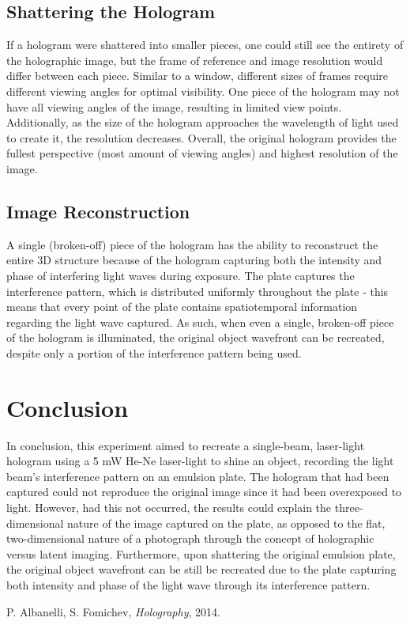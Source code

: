 \documentclass[12pt, letterpaper, twoside]{article}
\begin{document}
\subsection{Shattering the Hologram}

If a hologram were shattered into smaller pieces, one could still see the entirety of the holographic image, but the frame of reference and image resolution would differ between each piece. Similar to a window, different sizes of frames require different viewing angles for optimal visibility. One piece of the hologram may not have all viewing angles of the image, resulting in limited view points. Additionally, as the size of the hologram approaches the wavelength of light used to create it, the resolution decreases. Overall, the original hologram provides the fullest perspective (most amount of viewing angles) and highest resolution of the image. 

\subsection{Image Reconstruction}

A single (broken-off) piece of the hologram has the ability to reconstruct the entire 3D structure because of the hologram capturing both the intensity and phase of interfering light waves during exposure. The plate captures the interference pattern, which is distributed uniformly throughout the plate - this means that every point of the plate contains spatiotemporal information regarding the light wave captured. As such, when even a single, broken-off piece of the hologram is illuminated, the original object wavefront can be recreated, despite only a portion of the interference pattern being used.




\section{Conclusion}

In conclusion, this experiment aimed to recreate a single-beam, laser-light hologram using a 5 mW He-Ne laser-light to shine an object, recording the light beam's interference pattern on an emulsion plate. The hologram that had been captured could not reproduce the original image since it had been overexposed to light. However, had this not occurred, the results could explain the three-dimensional nature of the image captured on the plate, as opposed to the flat, two-dimensional nature of a photograph through the concept of holographic versus latent imaging. Furthermore, upon shattering the original emulsion plate, the original object wavefront can be still be recreated due to the plate capturing both intensity and phase of the light wave through its interference pattern.

\vfill\pagebreak

\appendix

\begin{thebibliography}{2}
     P. Albanelli, S. Fomichev, \textit{Holography}, 2014.
\end{thebibliography}
\end{document}
